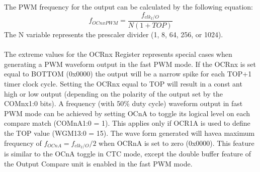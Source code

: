 \documentclass[english]{article}
\begin{document}
The PWM frequency for the output can be calculated by the following equation:
$$
f_{OCnxPWM}=\frac{f_{clk_I/O}}{N(1+TOP)}
$$
The N variable represents the prescaler divider (1, 8, 64, 256, or 1024).\\\\ 
The extreme values for the OCRnx Register represents special cases when generating a PWM waveform output in the fast PWM mode. If the OCRnx is set equal to BOTTOM (0x0000) the output will be a narrow spike for each TOP+1 timer clock cycle. Setting the OCRnx equal to TOP will result in a const
ant high or low output (depending on the polarity of the output set by the COMnx1:0 bits). A frequency (with 50\% duty cycle) waveform output in fast PWM mode can be achieved by setting OCnA to toggle its logical level on each compare match (COMnA1:0 = 1). This applies only if OCR1A is used to define the TOP value (WGM13:0 = 15). The wave form generated will havea maximum frequency of $f_{OCnA}=f_{clk_I/O}/2$ when OCRnA is set to zero (0x0000). This feature is similar to the OCnA toggle in CTC mode, except the double buffer feature of the Output Compare unit is enabled in the fast PWM mode.
\end{document}
